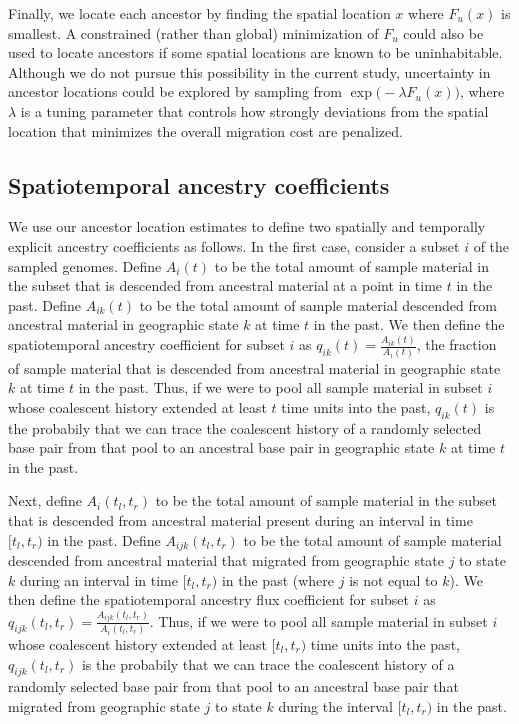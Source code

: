 Finally, we locate each ancestor by finding the spatial location $x$ where
$F_u(x)$ is smallest. A constrained (rather than global) minimization of $F_u$
could also be used to locate ancestors if some spatial locations are known to
be uninhabitable. Although we do not pursue this possibility in the current
study, uncertainty in ancestor locations could be explored by sampling from
$\exp\bigl(-\lambda F_u(x)\bigr)$, where $\lambda$ is a tuning parameter that
controls how strongly deviations from the spatial location that minimizes the
overall migration cost are penalized.

\subsection{Spatiotemporal ancestry coefficients}

We use our ancestor location estimates to define two spatially and
temporally explicit ancestry coefficients as follows. In the first case,
consider a subset $i$ of the sampled genomes. Define $A_i(t)$ to be the total
amount of sample material in the subset that is descended from ancestral
material at a point in time $t$ in the past. Define $A_{ik}(t)$ to be the total
amount of sample material descended from ancestral material in geographic
state $k$ at time $t$ in the past. We then define the spatiotemporal ancestry
coefficient for subset $i$ as $q_{ik}(t) = \frac{A_{ik}(t)}{A_i(t)}$, the fraction of
sample material that is descended from ancestral material in geographic
state $k$ at time $t$ in the past. Thus, if we were to pool all sample material
in subset $i$ whose coalescent history extended at least $t$ time units into the
past, $q_{ik}(t)$ is the probabily that we can trace the coalescent history of a
randomly selected base pair from that pool to an ancestral base pair in
geographic state $k$ at time $t$ in the past.

Next, define $A_i(t_l,t_r)$ to be the total amount of sample material in the
subset that is descended from ancestral material present during an interval in
time $[t_l,t_r)$ in the past. Define $A_{ijk}(t_l,t_r)$ to be the total amount
of sample material descended from ancestral material that migrated from
geographic state $j$ to state $k$ during an interval in time $[t_l, t_r)$ in
the past (where $j$ is not equal to $k$). We then define the spatiotemporal
ancestry flux coefficient for subset $i$ as 
$q_{ijk}(t_l, t_r) = \frac{A_{ijk}(t_l, t_r)}{A_i(t_l, t_r)}$. Thus, if we were
to pool all sample material in subset $i$ whose coalescent history extended at
least $[t_l,t_r)$ time units into the past, $q_{ijk}(t_l,t_r)$ is the probabily
that we can trace the coalescent history of a randomly selected base pair from
that pool to an ancestral base pair that migrated from geographic state $j$ to
state $k$ during the interval $[t_l,t_r)$ in the past.

